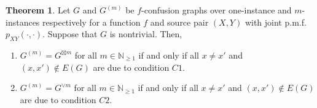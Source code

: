 \documentclass[journal, onecolumn, draftcls]{IEEEtran}
\theoremstyle{definition}
\newtheorem{theorem}{Theorem}
\newcommand{\calX}{\mathcal{X}}
\newcommand{\calY}{\mathcal{Y}}
\newcommand{\calZ}{\mathcal{Z}}
\newcommand{\bbN}{\mathbb{N}}
\begin{document}
\begin{theorem}\label{thm:theorem4}
%
Let $G$ and $G^{(m)}$ be $f$-confusion graphs over one-instance and $m$-instances respectively for a function $f$ and source pair $(X,Y)$ with joint p.m.f. $p_{XY}(\cdot, \cdot)$. Suppose that $G$ is nontrivial. Then,
    \begin{enumerate}[label=(\alph*)]
\item  $G^{(m)} = G^{\boxtimes m}$ for all $m\in\bbN_{\ge 1}$ if and only if all $x\ne x'$ and $(x,x')\notin E(G)$ are due to condition $C1$.\label{thm:theorem4_part_a}
    \item $G^{(m)} = G^{\lor m}$ for all $m\in\bbN_{\ge 1}$ if and only if all $x\ne x'$ and $(x,x')\notin E(G)$ are due to condition $C2$. \label{thm:theorem4_part_b}
\end{enumerate}
\end{theorem}
\end{document}
